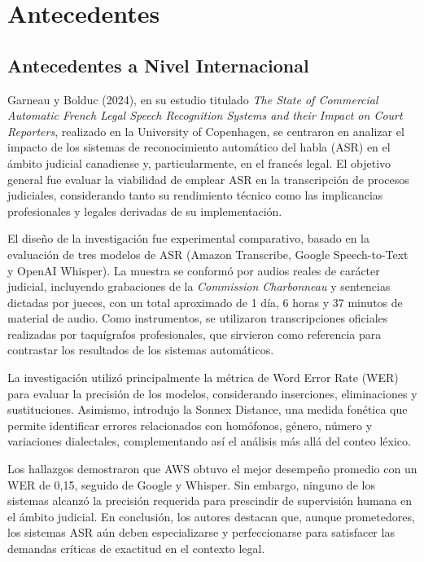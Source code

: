 \documentclass[12pt,a4paper,oneside]{report}
\begin{document}
\section{Antecedentes}

\subsection{Antecedentes a Nivel Internacional}

Garneau y Bolduc (2024), en su estudio titulado \textit{The State of Commercial Automatic French Legal Speech Recognition Systems and their Impact on Court Reporters}, realizado en la University of Copenhagen, se centraron en analizar el impacto de los sistemas de reconocimiento automático del habla (ASR) en el ámbito judicial canadiense y, particularmente, en el francés legal. El objetivo general fue evaluar la viabilidad de emplear ASR en la transcripción de procesos judiciales, considerando tanto su rendimiento técnico como las implicancias profesionales y legales derivadas de su implementación.

El diseño de la investigación fue experimental comparativo, basado en la evaluación de tres modelos de ASR (Amazon Transcribe, Google Speech-to-Text y OpenAI Whisper). La muestra se conformó por audios reales de carácter judicial, incluyendo grabaciones de la \textit{Commission Charbonneau} y sentencias dictadas por jueces, con un total aproximado de 1 día, 6 horas y 37 minutos de material de audio. Como instrumentos, se utilizaron transcripciones oficiales realizadas por taquígrafos profesionales, que sirvieron como referencia para contrastar los resultados de los sistemas automáticos.

La investigación utilizó principalmente la métrica de Word Error Rate (WER) para evaluar la precisión de los modelos, considerando inserciones, eliminaciones y sustituciones. Asimismo, introdujo la Sonnex Distance, una medida fonética que permite identificar errores relacionados con homófonos, género, número y variaciones dialectales, complementando así el análisis más allá del conteo léxico.

Los hallazgos demostraron que AWS obtuvo el mejor desempeño promedio con un WER de 0,15, seguido de Google y Whisper. Sin embargo, ninguno de los sistemas alcanzó la precisión requerida para prescindir de supervisión humana en el ámbito judicial. En conclusión, los autores destacan que, aunque prometedores, los sistemas ASR aún deben especializarse y perfeccionarse para satisfacer las demandas críticas de exactitud en el contexto legal.
\end{document}
